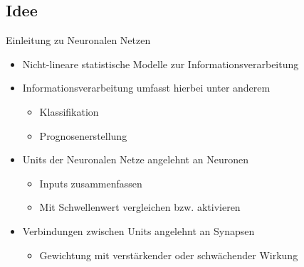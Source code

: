 \documentclass{beamer}
\begin{document}
\subsection{Idee}
\begin{frame}[t]{Einleitung zu Neuronalen Netzen}\vspace{30pt}
\begin{center}
\begin{itemize}
\large\item Nicht-lineare statistische Modelle zur Informationsverarbeitung
\large\item Informationsverarbeitung umfasst hierbei unter anderem
\begin{itemize}
\item Klassifikation
\item Prognosenerstellung
\end{itemize}
\large\item Units der Neuronalen Netze angelehnt an Neuronen
\begin{itemize}
\item Inputs zusammenfassen
\item Mit Schwellenwert vergleichen bzw. aktivieren
\end{itemize}
\large\item Verbindungen zwischen Units angelehnt an Synapsen
\begin{itemize}
\item Gewichtung mit verstärkender oder schwächender Wirkung
\end{itemize}
\end{itemize}
\end{center}
\end{frame}

    
\end{document}

